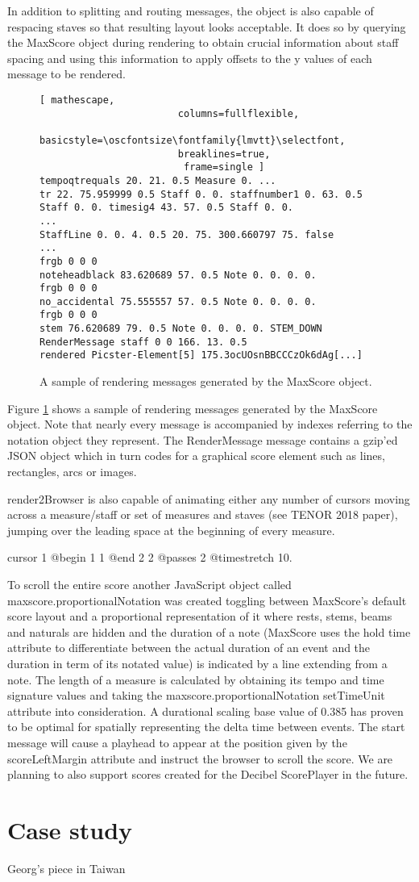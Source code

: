 In addition to splitting and routing messages, the object is also capable of respacing staves so that resulting layout looks acceptable. It does so by querying the MaxScore object during rendering to obtain crucial information about staff spacing and using this information to apply offsets to the y values of each message to be rendered.

\begin{figure}[h]
\centering
\begin{lstlisting}[ mathescape,
						columns=fullflexible,
						basicstyle=\oscfontsize\fontfamily{lmvtt}\selectfont,
						breaklines=true,
						 frame=single ]
tempoqtrequals 20. 21. 0.5 Measure 0. ...
tr 22. 75.959999 0.5 Staff 0. 0. staffnumber1 0. 63. 0.5 Staff 0. 0. timesig4 43. 57. 0.5 Staff 0. 0.
...
StaffLine 0. 0. 4. 0.5 20. 75. 300.660797 75. false
...
frgb 0 0 0
noteheadblack 83.620689 57. 0.5 Note 0. 0. 0. 0.
frgb 0 0 0
no_accidental 75.555557 57. 0.5 Note 0. 0. 0. 0.
frgb 0 0 0
stem 76.620689 79. 0.5 Note 0. 0. 0. 0. STEM_DOWN
RenderMessage staff 0 0 166. 13. 0.5 
rendered Picster-Element[5] 175.3ocUOsnBBCCCzOk6dAg[...]
\end{lstlisting}

\caption{A sample of rendering messages generated by the MaxScore object. 
\label{fig:maxscore-mesages}}
\end{figure}

Figure \ref{fig:maxscore-mesages} shows a sample of rendering messages generated by the MaxScore object. Note that nearly every message is accompanied by indexes referring to the notation object they represent. The RenderMessage message contains a gzip’ed JSON object which in turn codes for a graphical score element such as lines, rectangles, arcs or images.

render2Browser is also capable of animating either any number of cursors moving across a measure/staff or set of measures and staves (see TENOR 2018 paper), jumping over the leading space at the beginning of every measure.

cursor 1 @begin 1 1 @end 2 2 @passes 2 @timestretch 10.

To scroll the entire score another JavaScript object called maxscore.proportionalNotation was created toggling between MaxScore’s default score layout and a proportional representation of it where rests, stems, beams and naturals are hidden and the duration of a note (MaxScore uses the hold time attribute to differentiate between the actual duration of an event and the duration in term of its notated value) is indicated by a line extending from a note. The length of a measure is calculated by obtaining its tempo and time signature values and taking the maxscore.proportionalNotation setTimeUnit attribute into consideration. A durational scaling base value of 0.385 has proven to be optimal for spatially representing the delta time between events. The start message will cause a playhead to appear at the position given by the scoreLeftMargin attribute and instruct the browser to scroll the score. We are planning to also support scores created for the Decibel ScorePlayer in the future.






\section{Case study}

Georg's piece in Taiwan


